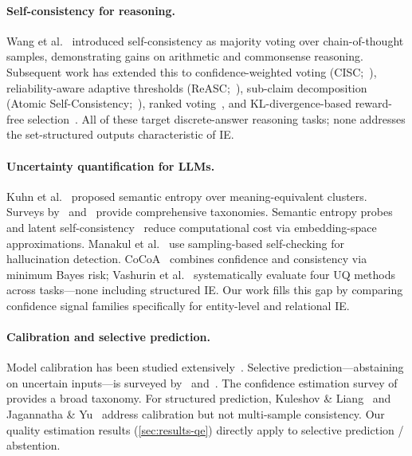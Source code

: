 \documentclass[11pt]{article}
\begin{document}
\paragraph{Self-consistency for reasoning.}
Wang et al.~\cite{wang2023selfconsistency} introduced self-consistency as majority voting over chain-of-thought samples, demonstrating gains on arithmetic and commonsense reasoning.
Subsequent work has extended this to confidence-weighted voting (CISC;~\citealt{cisc2025}), reliability-aware adaptive thresholds (ReASC;~\citealt{reasc2026}), sub-claim decomposition (Atomic Self-Consistency;~\citealt{atomic2024}), ranked voting~\cite{rankedvoting2025}, and KL-divergence-based reward-free selection~\cite{selfcertainty2026}.
All of these target discrete-answer reasoning tasks; none addresses the set-structured outputs characteristic of IE.

\paragraph{Uncertainty quantification for LLMs.}
Kuhn et al.~\cite{kuhn2023semantic} proposed semantic entropy over meaning-equivalent clusters.
Surveys by~\citet{uqsurvey2025} and~\citet{uqcalibsurvey2025} provide comprehensive taxonomies.
Semantic entropy probes~\cite{semanticprobes2024} and latent self-consistency~\cite{latentsc2025} reduce computational cost via embedding-space approximations.
Manakul et al.~\cite{manakul2023selfcheckgpt} use sampling-based self-checking for hallucination detection.
CoCoA~\cite{cocoa2025} combines confidence and consistency via minimum Bayes risk; Vashurin et al.~\cite{vashurin2025eval} systematically evaluate four UQ methods across tasks---none including structured IE.
Our work fills this gap by comparing confidence signal families specifically for entity-level and relational IE.

\paragraph{Calibration and selective prediction.}
Model calibration has been studied extensively~\cite{guo2017calibration,kadavath2022language,desai2020calibration}.
Selective prediction---abstaining on uncertain inputs---is surveyed by~\citet{geifman2017selective} and~\citet{knowyourlimits2025}.
The confidence estimation survey of~\citet{confestsurvey2024} provides a broad taxonomy.
For structured prediction, Kuleshov \& Liang~\cite{kuleshov2015structured} and Jagannatha \& Yu~\cite{jagannatha2022calibration} address calibration but not multi-sample consistency.
Our quality estimation results (\cref{sec:results-qe}) directly apply to selective prediction / abstention.
\end{document}
